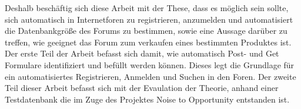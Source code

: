 Deshalb beschäftig sich diese Arbeit mit der These, dass es möglich sein sollte, sich automatisch in Internetforen zu registrieren, anzumelden und automatisiert die Datenbankgröße des Forums zu bestimmen, sowie eine Aussage darüber zu treffen, wie geeignet das Forum zum verkaufen eines bestimmten Produktes ist.
Der erste Teil der Arbeit befasst sich damit, wie automatisch Post- und Get Formulare identifiziert und befüllt werden können. Dieses legt die Grundlage für ein automatisiertes Registrieren, Anmelden und Suchen in den Foren. Der zweite Teil dieser Arbeit befasst sich mit der Evaulation der Theorie, anhand einer Testdatenbank die im Zuge des Projektes Noise to Opportunity entstanden ist.
\newpage